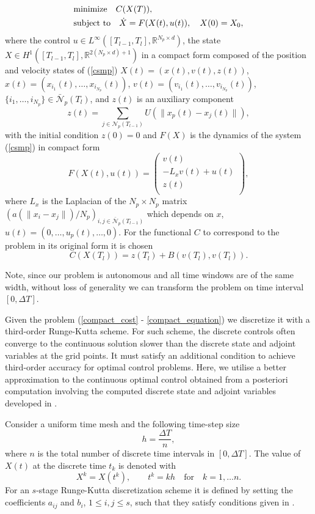 \documentclass[a4paper,10pt, english]{article}
\newcommand{\D}{\displaystyle}
\begin{document}
 \begin{align}
 \D
 & \mbox{minimize}\quad  C(X(T)),   \label{compact_cost} \\ 
 & \mbox{subject to} \quad \dot{X} = F(X(t), u(t)), \quad X(0) = X_0, \label{compact_equation}
 \end{align}
where  the control $u \in  L^{\infty}([T_{l-1}, T_{l}], \mathbb{R}^{N_p \times d})$,
the state $X\in H^1([T_{l-1}, T_{l}], \mathbb{R}^{2(N_p \times d)+1})$
in a compact form composed of the position and velocity 
states of (\ref{csmp})   $X(t) = (x(t), v(t), z(t))$, $x(t) = (x_{i_1}(t), \dots, x_{i_{N_p}}(t))$,
 $v(t) = (v_{i_1}(t), \dots, v_{i_{N_p}}(t))$, $\{i_1, \dots, i_{N_p}\} \in \bar{\mathcal{N}}_p(T_l)$, 
 and $z(t)$ is an auxiliary component 
 $$
 z(t) =  \sum_{j\in \mathcal{N}_p(T_{l-1})} U(\|x_p(t) - x_j(t)\|),
 $$
 with the initial condition $z(0) = 0$ and $F(X)$ is the dynamics of the system (\ref{csmp}) in compact form
 $$
 F(X(t), u(t)) =
  \left( 
  \begin{array}{c}
  v(t)\\
   - L_xv(t) + u(t)\\
   z(t)\\
 \end{array} 
 \right), 
 $$
 where $L_x$ is the Laplacian of the $N_p\times N_p$ matrix $(a(\|x_i - x_j\|)/N_p)_{i, j\in\bar{\mathcal{N}}_p(T_{l-1})}$ which depends on $x$, $u(t) = (0, \dots, u_p(t), \dots, 0)$.
 For the functional $C$ to correspond to the problem in its original form it is chosen 
 $$
 C(X(T_l)) = z(T_l) + B(v(T_l), v(T_l)).
 $$
 
  Note, since our problem is autonomous and all time windows are of the same width, without loss of generality
 we can transform the problem on time interval $[0, \Delta T]$. 
 
 
  
  Given the problem (\ref{compact_cost} - \ref{compact_equation}) we discretize it with a third-order Runge-Kutta scheme.  For such scheme, the discrete controls often converge to the continuous solution slower than the discrete state and adjoint variables at the grid points. It  must satisfy an additional condition to achieve third-order accuracy
    for optimal control problems. Here, we utilise a better approximation to the continuous optimal control obtained from a posteriori computation involving the computed discrete state and adjoint variables  developed in \cite{Hager2000}. 
    
  Consider a uniform time mesh and the following time-step size
 \begin{equation}
   h = \frac{\Delta T}{n},
   \label{h}
 \end{equation}
 where $n$ is the total number of discrete time intervals in $[0, \Delta T]$.  The value of $X(t)$ at the discrete time $t_k$ is denoted with
 $$
 X^k = X(t^k), \qquad t^k = kh \quad\mbox{for} \quad k = 1, \dots n.
 $$
 For an $s$-stage Runge-Kutta discretization scheme it is defined by setting the coefficients $a_{ij}$ and
 $b_{i}$, $1\leq i, j\leq s$, such that they satisfy conditions given in \cite{Hager2000}. 
 
\end{document}
